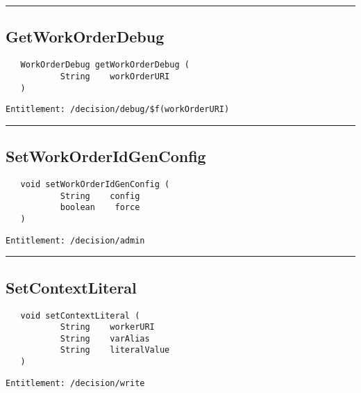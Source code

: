 \rule{12cm}{2pt}
\subsection{GetWorkOrderDebug}
\label{Api:GetWorkOrderDebug}
\begin{Verbatim}
   WorkOrderDebug getWorkOrderDebug (
           String    workOrderURI
   )
\end{Verbatim}
\begin{Verbatim}[formatcom=\color{Maroon}]
  Entitlement: /decision/debug/$f(workOrderURI)
\end{Verbatim}



\rule{12cm}{2pt}
\subsection{SetWorkOrderIdGenConfig}
\label{Api:SetWorkOrderIdGenConfig}
\begin{Verbatim}
   void setWorkOrderIdGenConfig (
           String    config
           boolean    force
   )
\end{Verbatim}
\begin{Verbatim}[formatcom=\color{Maroon}]
  Entitlement: /decision/admin
\end{Verbatim}



\rule{12cm}{2pt}
\subsection{SetContextLiteral}
\label{Api:SetContextLiteral}
\begin{Verbatim}
   void setContextLiteral (
           String    workerURI
           String    varAlias
           String    literalValue
   )
\end{Verbatim}
\begin{Verbatim}[formatcom=\color{Maroon}]
  Entitlement: /decision/write
\end{Verbatim}



